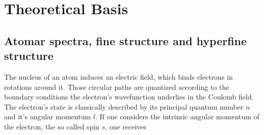 \section{Theoretical Basis}

\subsection{Atomar spectra, fine structure and hyperfine structure}

The nucleus of an atom induces an electric field, which binds electrons in rotations around it. Those circular paths are quantized according to the boundary conditions the electron's wavefunction underlies in the Coulomb field. The electron's state is classically described by its principal quantum number $n$ and it's angular momentum $l$. If one considers the intrinsic angular momentum of the electron, the so called spin $s$, one receives